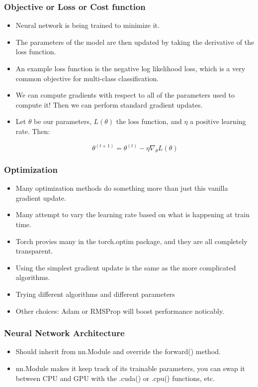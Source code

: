 \begin{frame}[fragile]
\frametitle{Objective or Loss or Cost function}

\begin{itemize}
\item Neural network is being trained to minimize it.
\item The parameters of the model are then updated by taking the derivative of the loss function. 
\item An example loss function is the negative log likelihood loss, which is a very common objective for multi-class classification.
\item We can compute gradients with respect to all of the parameters used to compute it! Then we can perform standard gradient updates.
\item Let $\theta$ be our parameters,  $L(\theta)$ the loss function, and $\eta$ a positive learning rate. Then:

$$ \theta^{(t+1)} = \theta^{(t)} - \eta \nabla_\theta L(\theta) $$
\end{itemize}

\end{frame} 

\begin{frame}[fragile]
\frametitle{Optimization}

\begin{itemize}
\item Many optimization methods do something more than just this vanilla gradient update.
\item Many attempt to vary the learning rate based on what is happening at train time. 
\item Torch provies many in the torch.optim package, and they are all completely transparent. 
\item Using the simplest gradient update is the same as the more complicated algorithms. 
\item Trying different algorithms and different parameters 
\item Other choices: Adam or RMSProp will boost performance noticably.
\end{itemize}

\end{frame} 

\begin{frame}[fragile]
\frametitle{Neural Network Architecture}

\begin{itemize}
\item Should inherit from nn.Module and override the forward() method.
\item  nn.Module makes it keep track of its trainable parameters, you can swap it between CPU and GPU with the .cuda() or .cpu() functions, etc.
\end{itemize}

\end{frame} 



